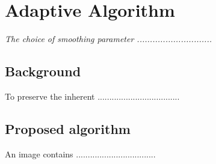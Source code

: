 \chapter{Adaptive Algorithm}
\label{C3} %
\graphicspath{{Figures/Chapter-3figs/PDF/}{Figures/Chapter-3figs/}}
\textit{The choice of smoothing parameter .............................}
\section{Background}
To preserve the inherent \cite{deadd} ...................................
\section{Proposed algorithm}	
An image contains ..................................

